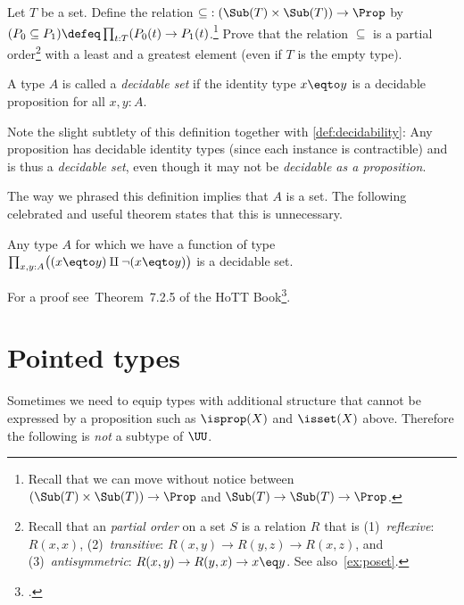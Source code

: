 \begin{xca}\label{xca:subsets-inclusion}
  Let $T$ be a set. 
  Define the relation ${\subseteq}: (\Sub(T)\times\Sub(T))\to\Prop$ 
  by $(P_0 \subseteq P_1) \defeq \prod_{t:T}(P_0(t)\to P_1(t)$.\footnote{%
  Recall that we can move without notice between 
  $(\Sub(T)\times\Sub(T))\to\Prop$ and $\Sub(T)\to\Sub(T)\to\Prop$.} 
  Prove that the relation ${\subseteq}$ is a partial
  order\footnote{\label{ft:partial-order}%
    Recall that an \emph{partial order} on a set $S$ is a relation $R$ that is
    (1)~\emph{reflexive}: $R(x,x)$,
    (2)~\emph{transitive}: $R(x,y) \to R(y,z) \to R(x,z)$, and
    (3)~\emph{antisymmetric}: $R(x,y) \to R(y,x) \to x\eq y$.
    See also~\cref{ex:poset}.}
  with a least and a greatest element (even if $T$ is the empty type).
\end{xca}

\begin{definition}\label{def:decidable-set}
  A type $A$ is called a \emph{decidable set} if the identity type $x \eqto y$
  is a decidable proposition for all $x,y:A$.
\end{definition}
Note the slight subtlety of this definition together with
\cref{def:decidability}: Any proposition has decidable identity types
(since each instance is contractible) and is thus a \emph{decidable set},
even though it may not be \emph{decidable as a proposition}.

The way we phrased this definition implies that $A$ is a set.
The following celebrated and useful theorem states that this is unnecessary.
\begin{theorem}[Hedberg]\label{thm:hedberg}
  Any type $A$ for which we have a function of type
  $\prod_{x,y:A}\bigl((x \eqto y) \amalg \lnot(x \eqto y)\bigr)$
  is a decidable set.
\end{theorem}
For a proof see~Theorem~7.2.5 of the HoTT Book\footcite{hottbook}.

\section{Pointed types}\label{sec:pointedtypes}
Sometimes we need to equip types with additional structure
that cannot be expressed by a proposition such as
$\isprop(X)$ and $\isset(X)$ above.
Therefore the following is \emph{not} a subtype of $\UU$.

